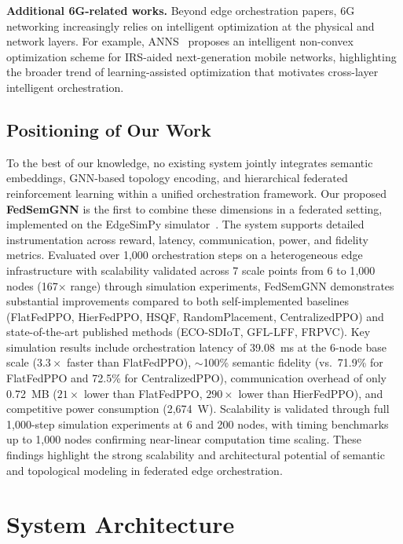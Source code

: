 \documentclass[conference]{IEEEtran}
\begin{document}
	\noindent\textbf{Additional 6G-related works.} Beyond edge orchestration papers, 6G networking increasingly relies on intelligent optimization at the physical and network layers. For example, ANNS~\cite{chen2025anns} proposes an intelligent non-convex optimization scheme for IRS-aided next-generation mobile networks, highlighting the broader trend of learning-assisted optimization that motivates cross-layer intelligent orchestration.
	
	
	\subsection{Positioning of Our Work}
	
	\textcolor{revblue}{To the best of our knowledge, no existing system jointly integrates semantic embeddings, GNN-based topology encoding, and hierarchical federated reinforcement learning within a unified orchestration framework. Our proposed \textbf{FedSemGNN} is the first to combine these dimensions in a federated setting, implemented on the EdgeSimPy simulator~\cite{souza2023edgesimpy}. The system supports detailed instrumentation across reward, latency, communication, power, and fidelity metrics. Evaluated over 1,000 orchestration steps on a heterogeneous edge infrastructure with scalability validated across 7 scale points from 6 to 1{,}000 nodes (167$\times$ range) through simulation experiments, FedSemGNN demonstrates substantial improvements compared to both self-implemented baselines (FlatFedPPO, HierFedPPO, HSQF, RandomPlacement, CentralizedPPO) and state-of-the-art published methods (ECO-SDIoT, GFL-LFF, FRPVC). Key simulation results include orchestration latency of 39.08~ms at the 6-node base scale ($3.3\times$ faster than FlatFedPPO), $\sim$100\% semantic fidelity (vs.\ 71.9\% for FlatFedPPO and 72.5\% for CentralizedPPO), communication overhead of only 0.72~MB ($21\times$ lower than FlatFedPPO, $290\times$ lower than HierFedPPO), and competitive power consumption (2{,}674~W). Scalability is validated through full 1{,}000-step simulation experiments at 6 and 200 nodes, with timing benchmarks up to 1{,}000 nodes confirming near-linear computation time scaling. These findings highlight the strong scalability and architectural potential of semantic and topological modeling in federated edge orchestration.}
	
	
	\section{System Architecture}
	\label{sec:system_architecture}
	
\end{document}
